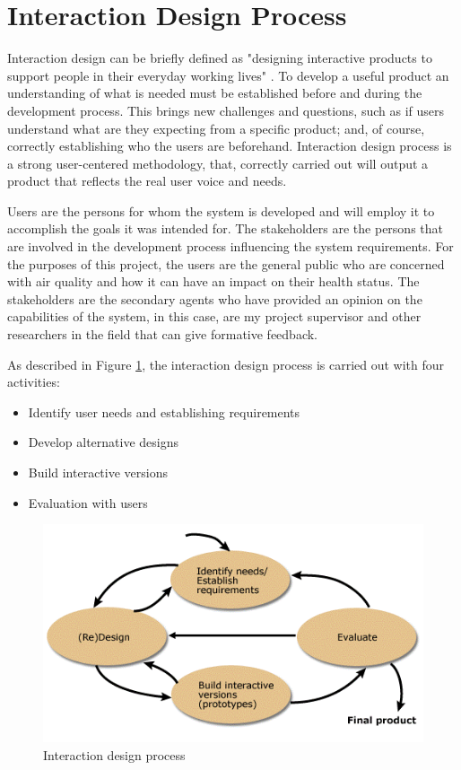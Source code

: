 \section{Interaction Design Process}
Interaction design can be briefly defined as "designing interactive products to support people in their everyday working lives" \cite{Sharp2011}. To develop a useful product an understanding of what is needed must be established before and during the development process. This brings new challenges and questions, such as if users understand what are they expecting from a specific product; and, of course, correctly establishing who the users are beforehand. Interaction design process is a strong user-centered methodology, that, correctly carried out will output a product that reflects the real user voice and needs. 

Users are the persons for whom the system is developed and will employ it to accomplish the goals it was intended for. The stakeholders are the persons that are involved in the development process influencing the system requirements. For the purposes of this project, the users are the general public who are concerned with air quality and how it can have an impact on their health status. The stakeholders are the secondary agents who have provided an opinion on the capabilities of the system, in this case, are my project supervisor and other researchers in the field that can give formative feedback.

As described in Figure \ref{fig:interaction_design}, the interaction design process is carried out with four activities: \begin{itemize}
  \item Identify user needs and establishing requirements
  \item Develop alternative designs
  \item Build interactive versions
  \item Evaluation with users
\end{itemize}

\begin{figure}[h]
  \includegraphics[scale=.8]{images/interatcion-design.png}
  \caption[Interaction design process]{Interaction design process \cite{Sharp2011}}
  \label{fig:interaction_design}
\end{figure}

